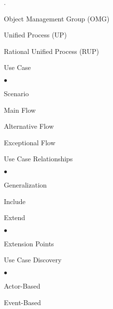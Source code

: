 \documentclass[11pt]{article}
\begin{document}
{\begin{list}{.}
\item Object Management Group (OMG)

\item Unified Process (UP)

\item Rational Unified Process (RUP)

\item Use Case

    \begin{list}{$\bullet$}{\itemsep 0.01in \parskip 0in \parsep 0in}

        \item Scenario

        \item Main Flow

        \item Alternative Flow

        \item Exceptional Flow

        \item Use Case Relationships

            \begin{list}{$\bullet$}{\itemsep 0.01in \parskip 0in \parsep 0in}

                \item Generalization

                \item Include

                \item Extend

                    \begin{list}{$\bullet$}{\itemsep 0.01in \parskip 0in \parsep 0in}

                        \item Extension Points

                    \end{list}

            \end{list}

        \item Use Case Discovery

            \begin{list}{$\bullet$}{\itemsep 0.01in \parskip 0in \parsep 0in}

                \item Actor-Based

                \item Event-Based


\end{list}
\end{list}
\end{list}}
\end{document}
